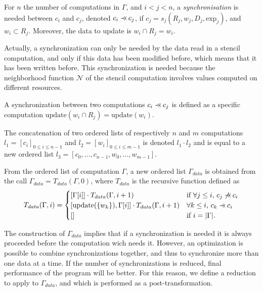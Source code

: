\begin{mydef}
For $n$ the number of computations in $\Gamma$, and $i<j<n$, a \textit{synchronisation} is needed between $c_i$ and $c_j$, denoted $c_i \pprec c_j$, if $c_j=s_j(R_j,w_j,D_j,\text{exp}_j)$, and $w_i \subset R_j$. Moreover, the data to update is $w_i \cap R_j = w_i$.
\end{mydef}

Actually, a synchronization can only be needed by the data read in a stencil computation, and only if this data has been modified before, which means that it has been written before. This synchronization is needed because the neighborhood function $\mathcal{N}$ of the stencil computation involves values computed on different resources.

\begin{mydef}
A synchronization between two computations $c_i \pprec c_j$ is defined as a specific computation $\text{update}(w_i \cap R_j)=\text{update}(w_i)$.
\end{mydef}

\begin{mydef}
The concatenation of two ordered lists of respectively $n$ and $m$ computations $l_1=[c_i]_{0 \leq i \leq n-1}$ and $l_2=[w_i]_{0 \leq i \leq m-1}$ is denoted $l_1 \cdot l_2$ and is equal to a new ordered list $l_3=[c_0,\dots,c_{n-1},w_0,\dots,w_{m-1}]$.
\end{mydef}

\begin{mydef}
From the ordered list of computation $\Gamma$, a new ordered list $\Gamma_{data}$ is obtained from the call $\Gamma_{data} = T_{data}(\Gamma,0)$, where $T_{data}$ is the recursive function defined as
\begin{equation*}
T_{data}(\Gamma,i) = 
\begin{cases} 	[\Gamma[i]] \cdot T_{data}(\Gamma,i+1) & \mbox{if }\forall j\leq i\mbox{, } c_j \not\pprec c_i\\
				[\text{update}(\{w_k\}),\Gamma[i]] \cdot T_{data}(\Gamma,i+1) & \forall k \leq i\mbox{, }c_k \pprec c_i\\
				[] & \mbox{if }i=|\Gamma|.
\end{cases}
\end{equation*}
\end{mydef}

The construction of $\Gamma_{data}$ implies that if a synchronization is needed it is always proceeded before the computation wich needs it. However, an optimization is possible to combine synchronizations together, and thus to synchronize more than one data at a time. If the number of synchronizations is reduced, final performance of the program will be better. For this reason, we define a reduction to apply to $\Gamma_{data}$, and which is performed as a post-transformation.

